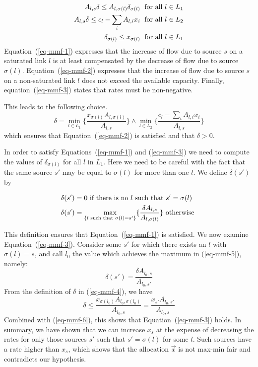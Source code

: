 \begin{eqnarray}
         A_{l,s} \delta \leq A_{l, \sigma(l)} \delta_{\sigma(l)} \; \textrm{ for all } l \in
        L_{1}
        \label{eq-mmf-1}  \\
        A_{l,s} \delta  \leq c_{l} - \sum_{i}A_{l,i}x_{i} \; \textrm{ for all } l \in L_{2}
        \label{eq-mmf-2}  \\
        \delta_{\sigma(l)} \leq x_{\sigma(l)} \; \textrm{ for all } l \in L_{1}
        \label{eq-mmf-3}
\end{eqnarray}
Equation~(\ref{eq-mmf-1}) expresses that the increase of flow
due to source $s$ on a saturated link $l$ is at least
compensated by the decrease of flow due to source $\sigma(l)$.
Equation~(\ref{eq-mmf-2}) expresses that the increase of flow
due to source $s$ on a non-saturated link $l$ does not exceed
the available capacity. Finally, equation~(\ref{eq-mmf-3})
states that rates must be non-negative.

This leads to the following choice.
\begin{equation}
        \delta = \min_{l \in L_{1}}
        \{  \frac{x_{\sigma(l)} A_{l, \sigma(l)}}{A_{l,s}}\}
        \wedge
        \min_{l \in L_{2}}
        \{  \frac{c_{l}-\sum_{i}A_{l,i}x_{i}}{A_{l,s}}\}
        \label{eq-mmf-4}
\end{equation}
which ensures that Equation~(\ref{eq-mmf-2}) is satisfied and
that $\delta >0$.

In order to satisfy Equations~(\ref{eq-mmf-1}) and
(\ref{eq-mmf-3}) we need to compute the values of
$\delta_{\sigma(l)}$ for all $l$ in $L_{1}$. Here we need to
be careful with the fact that the same source $s'$ may be
equal to $\sigma(l)$ for more than one $l$. We define
$\delta(s')$ by

\begin{eqnarray}
         \delta(s') & = 0  \textrm{ if there is no } l \textrm{ such that } s'=\sigma(l)
        \label{eq-mmf-50}  \\
        \delta(s') & =
                \max_{\{l \textrm{ such that } \sigma(l) = s'\}}
                \{ \frac{\delta A_{l,s}}{A_{l, \sigma(l)}} \}
                \textrm{ otherwise }
        \label{eq-mmf-5}
\end{eqnarray}

This definition ensures that Equation~(\ref{eq-mmf-1}) is
satisfied. We now examine Equation~(\ref{eq-mmf-3}). Consider
some $s'$ for which there exists an $l$ with $\sigma(l)=s$,
and call $l_{0}$ the value which achieves the maximum in
(\ref{eq-mmf-5}), namely:
\begin{equation}
        \delta(s') = \frac{\delta A_{l_{0},s}}{A_{l_{0}, s'}}
        \label{eq-mmf-6}
\end{equation}
From the definition of $\delta$ in (\ref{eq-mmf-4}), we have
$$
\delta \leq \frac{x_{\sigma(l_{0})}A_{l_{0}, \sigma(l_{0})} }{
A_{l_{0},s}}
=
\frac{x_{s'}A_{l_{0}, s'} }{ A_{l_{0},s}}
$$
Combined with (\ref{eq-mmf-6}), this shows that
Equation~(\ref{eq-mmf-3}) holds. In summary, we have shown
that we can increase $x_{s}$ at the expense of decreasing the
rates for only those sources $s'$ such that $s'=\sigma(l)$ for
some $l$. Such sources have a rate higher than $x_{s}$, which
shows that the allocation $\vec{x}$ is not max-min fair and
contradicts our hypothesis.

